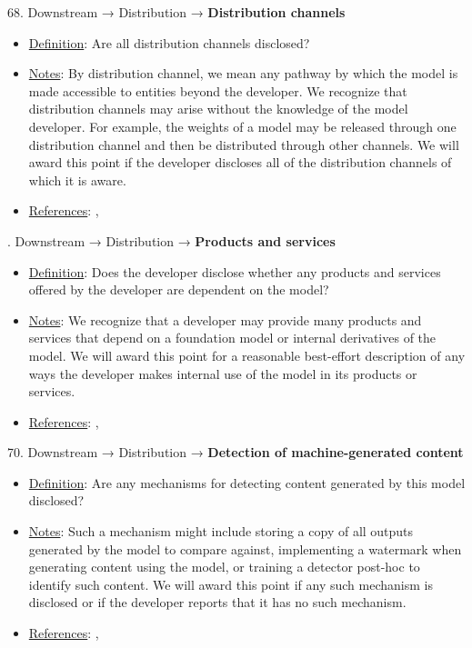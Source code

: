 68. Downstream → Distribution → \textbf{Distribution channels}
\vspace{-\parskip}
\begin{itemize}
	\item
	\underline{Definition}: Are all distribution channels disclosed?
	\item
	\underline{Notes}: By distribution channel, we mean any pathway by which the model is made accessible to entities beyond the developer. We recognize that distribution channels may arise without the knowledge of the model developer. For example, the weights of a model may be released through one distribution channel and then be distributed through other channels. We will award this point if the developer discloses all of the distribution channels of which it is aware.
	\item
	\underline{References}: \citet{cobbe2023supply}, \citet{widder2023thinking}
\end{itemize} \vspace{\baselineskip}


. Downstream → Distribution → \textbf{Products and services}
\vspace{-\parskip}
\begin{itemize}
	\item
	\underline{Definition}: Does the developer disclose whether any products and services offered by the developer are dependent on the model?
	\item
	\underline{Notes}: We recognize that a developer may provide many products and services that depend on a foundation model or internal derivatives of the model. We will award this point for a reasonable best-effort description of any ways the developer makes internal use of the model in its products or services.
	\item
	\underline{References}: \citet{cobbe2023supply}, \citet{cen2023supplychain}
\end{itemize} \vspace{\baselineskip}


70. Downstream → Distribution → \textbf{Detection of machine-generated content}
\vspace{-\parskip}
\begin{itemize}
	\item
	\underline{Definition}: Are any mechanisms for detecting content generated by this model disclosed?
	\item
	\underline{Notes}: Such a mechanism might include storing a copy of all outputs generated by the model to compare against, implementing a watermark when generating content using the model, or training a detector post-hoc to identify such content. We will award this point if any such mechanism is disclosed or if the developer reports that it has no such mechanism.
	\item
	\underline{References}: \citet{kirchenbauer2023watermark}, \citet{Kuditipudi2023RobustDW}
\end{itemize} \vspace{\baselineskip}


